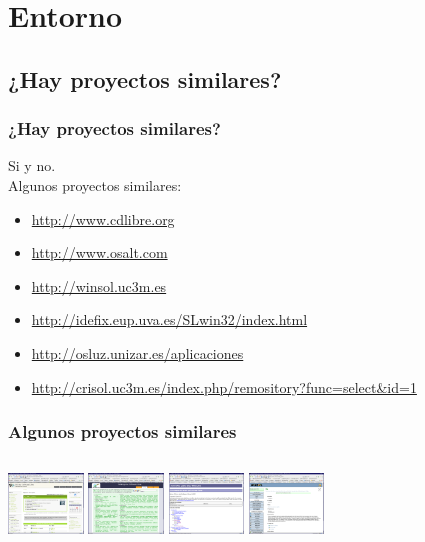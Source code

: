 
\section{Entorno}
	\subsection{¿Hay proyectos similares?}
	\begin{frame}
		\frametitle{¿Hay proyectos similares?}
		Si y no. \\
		Algunos proyectos similares:
		\begin{itemize}
			\item <1-| alert@1> \url{http://www.cdlibre.org}
			\item <1-| alert@1> \url{http://www.osalt.com}
			\item <1-| alert@1> \url{http://winsol.uc3m.es}
			\item <1-| alert@1> \url{http://idefix.eup.uva.es/SLwin32/index.html}
			\item <1-| alert@1> \url{http://osluz.unizar.es/aplicaciones}
			\item <1-| alert@1> \url{http://crisol.uc3m.es/index.php/remository?func=select&id=1}
		\end{itemize}
	\end{frame}

	\begin{frame}
		\frametitle{Algunos proyectos similares}
		\begin{columns}
		\column{5.5cm}
			\includegraphics[width=2cm]{images/entorno01.png}
			\includegraphics[width=2cm]{images/entorno02.png}
		\column{5.5cm}
			\includegraphics[width=2cm]{images/entorno03.png}
			\includegraphics[width=2cm]{images/entorno04.png}
		\end{columns}
	\end{frame}


